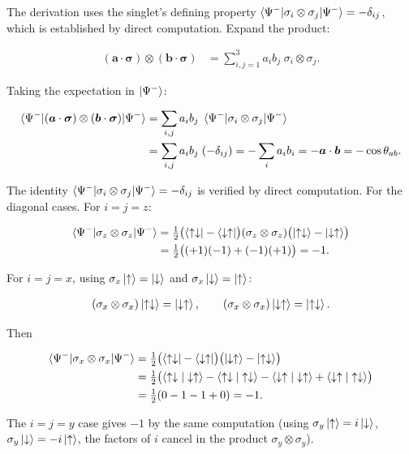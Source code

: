 The derivation uses the singlet's defining property $\braket{\Psi^-|\sigma_i \otimes \sigma_j|\Psi^-} = -\delta_{ij}$, which is established by direct computation. Expand the product:
\begin{linenomath}
\begin{align}
(\bm a \cdot \bm \sigma) \otimes (\bm b \cdot \bm \sigma)
&= \sum_{i,j=1}^{3} a_i b_j \; \sigma_i \otimes \sigma_j.
\end{align}
\end{linenomath}
Taking the expectation in $\ket{\Psi^-}$:
\begin{linenomath}
\begin{align}
\braket{\Psi^-|(\bm a \cdot \bm \sigma) \otimes (\bm b \cdot \bm \sigma)|\Psi^-}
&= \sum_{i,j} a_i b_j \; \braket{\Psi^-|\sigma_i \otimes \sigma_j|\Psi^-} \\
&= \sum_{i,j} a_i b_j \; (-\delta_{ij})
= -\sum_i a_i b_i = -\bm a \cdot \bm b = -\cos\theta_{ab}.
\end{align}
\end{linenomath}
The identity $\braket{\Psi^-|\sigma_i \otimes \sigma_j|\Psi^-} = -\delta_{ij}$ is verified by direct computation. For the diagonal cases. For $i=j=z$:
\begin{linenomath}
\begin{align}
\braket{\Psi^-|\sigma_z \otimes \sigma_z|\Psi^-}
&= \tfrac12\bigl(\bra{\uparrow\downarrow} - \bra{\downarrow\uparrow}\bigr)
(\sigma_z \otimes \sigma_z)
\bigl(\ket{\uparrow\downarrow} - \ket{\downarrow\uparrow}\bigr) \\
&= \tfrac12\bigl((+1)(-1) + (-1)(+1)\bigr) = -1.
\end{align}
\end{linenomath}
For $i=j=x$, using $\sigma_x\ket{\uparrow} = \ket{\downarrow}$ and $\sigma_x\ket{\downarrow} = \ket{\uparrow}$:
\begin{linenomath}
\begin{align}
(\sigma_x\otimes\sigma_x)\ket{\uparrow\downarrow}
= \ket{\downarrow\uparrow},\qquad
(\sigma_x\otimes\sigma_x)\ket{\downarrow\uparrow}
= \ket{\uparrow\downarrow}.
\end{align}
\end{linenomath}
Then
\begin{linenomath}
\begin{align}
\braket{\Psi^-|\sigma_x \otimes \sigma_x|\Psi^-}
&= \tfrac12\bigl(\bra{\uparrow\downarrow} - \bra{\downarrow\uparrow}\bigr)
\bigl(\ket{\downarrow\uparrow} - \ket{\uparrow\downarrow}\bigr) \\
&= \tfrac12\bigl(\braket{\uparrow\downarrow|\downarrow\uparrow} - \braket{\uparrow\downarrow|\uparrow\downarrow}
- \braket{\downarrow\uparrow|\downarrow\uparrow} + \braket{\downarrow\uparrow|\uparrow\downarrow}\bigr) \\
&= \tfrac12(0 - 1 - 1 + 0) = -1.
\end{align}
\end{linenomath}
The $i=j=y$ case gives $-1$ by the same computation (using $\sigma_y\ket{\uparrow}=i\ket{\downarrow}$, $\sigma_y\ket{\downarrow}=-i\ket{\uparrow}$, the factors of $i$ cancel in the product $\sigma_y\otimes\sigma_y$).

